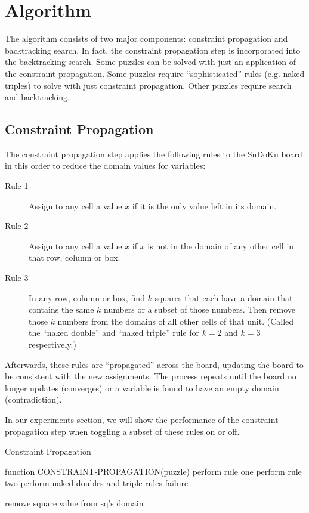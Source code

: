 \section{Algorithm}\label{sec:alg}

The algorithm consists of two major components: constraint propagation and backtracking search. In fact, the constraint propagation step is incorporated into the backtracking search. Some puzzles can be solved with just an application of the constraint propagation. Some puzzles require ``sophisticated'' rules (e.g. naked triples) to solve with just constraint propagation. Other puzzles require search and backtracking.

\subsection{Constraint Propagation}

The constraint propagation step applies the following rules to the SuDoKu board in this order to reduce the domain values for variables:

\begin{description}
	\item[Rule 1] Assign to any cell a value $x$ if it is the only value left in its domain.
	\item[Rule 2] Assign to any cell a value $x$ if $x$ is not in the domain of any other cell in that row, column or box.
	\item[Rule 3] In any row, column or box, find $k$ squares that each have a domain that contains the same $k$ numbers or a subset of those numbers. Then remove those $k$ numbers from the domains of all other cells of that unit. (Called the ``naked double'' and ``naked triple'' rule for $k=2$ and $k=3$ respectively.)
\end{description}

Afterwards, these rules are ``propagated'' across the board, updating the board to be consistent with the new assignments. The process repeats until the board no longer updates (converges) or a variable is found to have an empty domain (contradiction).

In our experiments section, we will show the performance of the constraint propagation step when toggling a subset of these rules on or off.

\begin{algorithm}[H]
\caption{Constraint Propagation}
\label{constraint}
\begin{algorithmic}
\STATE function CONSTRAINT-PROPAGATION(puzzle)
	\STATE perform rule one
	\STATE perform rule two
	\STATE perform naked doubles and triple rules
			\RETURN failure
		\ENDIF

				\STATE remove square.value from sq's domain
			\ENDFOR
		\ENDIF
	\ENDFOR
\ENDWHILE
\end{algorithmic}
\end{algorithm}

